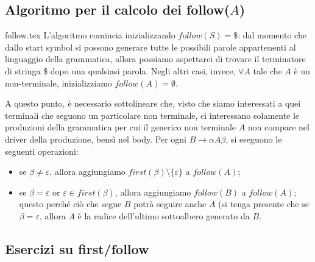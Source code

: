 \documentclass[class=book, crop=false, oneside, 12pt]{standalone}
\begin{document}
\subsection{Algoritmo per il calcolo dei follow(\(A\))}
{follow.tex}
L'algoritmo comincia inizializzando \(follow(S) = \$\): dal momento che dallo start symbol si possono generare tutte le possibili parole appartenenti al linguaggio della grammatica, allora possiamo aspettarci di trovare il terminatore di stringa \$ dopo una qualsiasi parola. Negli altri casi, invece, \(\forall A\) tale che \(A\) è un non-terminale, inizializziamo \(follow(A) = \emptyset\).

A questo punto, è necessario sottolineare che, visto che siamo interessati a quei terminali che seguono un particolare non terminale, ci interessano solamente le produzioni della grammatica per cui il generico non terminale \(A\) non compare nel driver della produzione, bensì nel body. Per ogni \(B \rightarrow \alpha A \beta\), si eseguono le seguenti operazioni: 

\begin{itemize}
    \item se \(\beta \neq \varepsilon\), allora aggiungiamo \(first(\beta) \setminus \{\varepsilon\}\) a \(follow(A)\);
    \item se \(\beta = \varepsilon\) or \(\varepsilon \in first(\beta)\), allora aggiungiamo \(follow(B)\) a \(follow(A)\); questo perché ciò che segue \(B\) potrà seguire anche \(A\) (si tenga presente che se \(\beta = \varepsilon\), allora \(A\) è la radice dell'ultimo sottoalbero generato da \(B\).
\end{itemize}   
\subsection{Esercizi su first/follow}
\end{document}
